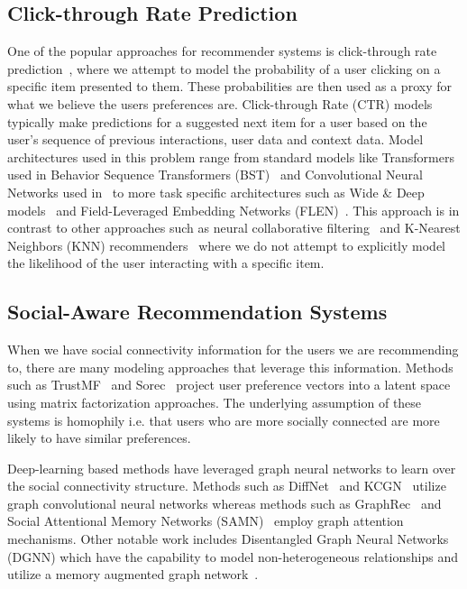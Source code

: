 \documentclass{article}
\begin{document}
\subsection{Click-through Rate Prediction}
One of the popular approaches for recommender systems is click-through rate prediction~\cite{zhang2021deep}, where we attempt to model the probability of a user clicking on a specific item presented to them. These probabilities are then used as a proxy for what we believe the users preferences are. Click-through Rate (CTR) models typically make predictions for a suggested next item for a user based on the user's sequence of previous interactions, user data and context data. Model architectures used in this problem range from standard models like Transformers used in Behavior Sequence Transformers (BST)~\cite{chen2019behavior} and Convolutional Neural Networks used in~\cite{liu2015convolutional} to more task specific architectures such as Wide \& Deep models~\cite{cheng2016wide} and Field-Leveraged Embedding Networks (FLEN)~\cite{chen2019flen}. This approach is in contrast to other approaches such as neural collaborative filtering~\cite{bai2017neural} and K-Nearest Neighbors (KNN) recommenders~\cite{subramaniyaswamy2017adaptive} where we do not attempt to explicitly model the likelihood of the user interacting with a specific item.


\subsection{Social-Aware Recommendation Systems}
When we have social connectivity information for the users we are recommending to, there are many modeling approaches that leverage this information. Methods such as TrustMF~\cite{yang2016social} and Sorec~\cite{ma2008sorec} project user preference vectors into a latent space using matrix factorization approaches. The underlying assumption of these systems is homophily i.e. that users who are more socially connected are more likely to have similar preferences.

Deep-learning based methods have leveraged graph neural networks to learn over the social connectivity structure. Methods such as DiffNet~\cite{wu2019neural} and KCGN~\cite{huang2021knowledge} utilize graph convolutional neural networks whereas methods such as GraphRec~\cite{fan2019graph} and Social Attentional Memory Networks (SAMN)~\cite{chen2019social} employ graph attention mechanisms. Other notable work includes Disentangled Graph Neural Networks (DGNN) which have the capability to model non-heterogeneous relationships and utilize a memory augmented graph network~\cite{xia2023disentangled}. 
\end{document}
